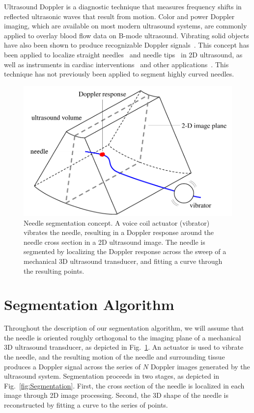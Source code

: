 Ultrasound Doppler is a diagnostic technique that measures frequency shifts in reflected ultrasonic waves that result from motion. Color and power Doppler imaging, which are available on most modern ultrasound systems, are commonly applied to overlay blood flow data on B-mode ultrasound. Vibrating solid objects have also been shown to produce recognizable Doppler signals~\cite{Holen1985}. This concept has been applied to localize straight needles~\cite{Armstrong2001,Feld1997,Hamper1991} and needle tips~\cite{Harmat2006} in 2D ultrasound, as well as instruments in cardiac interventions~\cite{Fronheiser2008,Reddy2008} and other applications~\cite{McAleavey2003,Rogers2009}. This technique has not previously been applied to segment highly curved needles.

\begin{figure}[!t]
\centering
\includegraphics[width = 0.75\columnwidth]{Images/Chapter2/SliceConcept/SliceConcept}%
\caption[3D ultrasound segmentation concept]{Needle segmentation concept. A voice coil actuator (vibrator) vibrates the needle, resulting in a Doppler response around the needle cross section in a 2D ultrasound image. The needle is segmented by localizing the Doppler response across the sweep of a mechanical 3D ultrasound transducer, and fitting a curve through the resulting points.}
\label{fig:SliceConcept}
\end{figure}

\section{Segmentation Algorithm}
\label{sec:Algorithms}
Throughout the description of our segmentation algorithm, we will assume that the needle is oriented roughly orthogonal to the imaging plane of a mechanical 3D ultrasound transducer, as depicted in Fig.~\ref{fig:SliceConcept}. An actuator is used to vibrate the needle, and the resulting motion of the needle and surrounding tissue produces a Doppler signal across the series of $N$ Doppler images generated by the ultrasound system. Segmentation proceeds in two stages, as depicted in Fig.~\ref{fig:Segmentation}. First, the cross section of the needle is localized in each image through 2D image processing. Second, the 3D shape of the needle is reconstructed by fitting a curve to the series of points.

